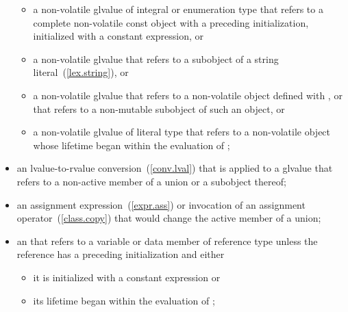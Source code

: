 \begin{itemize}
\begin{itemize}
  \item
  a non-volatile glvalue of integral or enumeration type that refers
  to a complete non-volatile const object with a preceding initialization,
  initialized with a constant expression, or

  \item
  a non-volatile glvalue that refers to a subobject of a string
  literal~(\ref{lex.string}), or

  \item
  a non-volatile glvalue that refers to a non-volatile object
  defined with , or that refers to a non-mutable subobject
  of such an object, or

  \item
  a non-volatile glvalue of literal type that refers to a non-volatile object
  whose lifetime began within the evaluation of ;
\end{itemize}

\item
an lvalue-to-rvalue conversion~(\ref{conv.lval})
that is applied to a glvalue
that refers to a non-active member of a union or a subobject thereof;

\item
an assignment expression~(\ref{expr.ass})
or invocation of an assignment operator~(\ref{class.copy})
that would change the active member of a union;

\item
an  that refers to a variable or
data member of reference type
unless the reference has a preceding initialization and either

\begin{itemize}
  \item
  it is initialized with a constant expression or

  \item
  its lifetime began within the evaluation of ;
\end{itemize}


\end{itemize}
